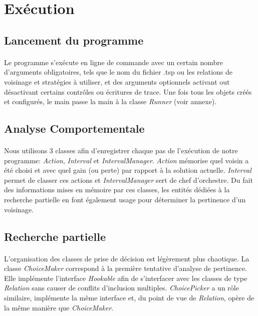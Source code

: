 \documentclass[a4paper,10pt]{report}
\begin{document}
\section{Exécution}
\subsection{Lancement du programme}
\paragraph{}
  Le programme s'exécute en ligne de commande avec un certain nombre d'arguments
obligatoires, tels que le nom du fichier .tsp ou les relations de voisinage et
stratégies à utiliser, et des arguments optionnels activant out désactivant
certains contrôles ou écritures de trace. Une fois tous les objets créés et
configurés, le main passe la main à la classe \textit{Runner} (voir annexe).

\subsection{Analyse Comportementale}
\paragraph{}
  Nous utilisons 3 classes afin d'enregistrer chaque pas de l'exécution de notre
programme: \textit{Action}, \textit{Interval} et \textit{IntervalManager}.
\textit{Action} mémorise quel voisin a été choisi et avec quel gain (ou perte)
par rapport à la solution actuelle. \textit{Interval} permet de classer ces
actions et \textit{IntervalManager} sert de chef d'orchestre. Du fait des
informations mises en mémoire par ces classes, les entités dédiées à la
recherche partielle en font également usage pour déterminer la pertinence d'un
voisinage.

\subsection{Recherche partielle}
\paragraph{}
  L'organisation des classes de prise de décision est légèrement plus chaotique.
La classe \textit{ChoiceMaker} correspond à la première tentative d'analyse de
pertinence. Elle implémente l'interface \textit{Hookable} afin de s'interfacer
avec les classes de type \textit{Relation} sans causer de conflits d'inclusion
multiples. \textit{ChoicePicker} a un rôle similaire, implémente la même
interface et, du point de vue de \textit{Relation}, opère de la même manière
que \textit{ChoiceMaker}.
\end{document}
